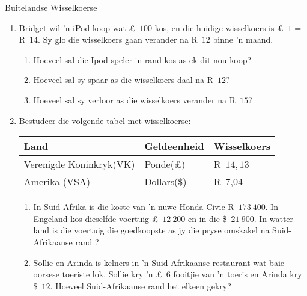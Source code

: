 \begin{exercises}{Buitelandse Wisselkoerse}
{
    \begin{enumerate}[label=\textbf{\arabic*}.]
	\item Bridget wil ’n iPod koop wat £~$100$ kos, en die huidige wisselkoers is £~$1$ = R~$14$. Sy glo die wisselkoers gaan verander na R~$12$ binne ’n maand.
	\begin{enumerate}
	    \item Hoeveel sal die Ipod speler in rand kos as ek dit nou koop?
	    \item Hoeveel sal sy spaar as die wisselkoers daal na R~$12$?
	    \item Hoeveel sal sy verloor as die wisselkoers verander na R~$15$?
	\end{enumerate}

	\item Bestudeer die volgende tabel met wisselkoerse:
	\begin{center}
	    \begin{tabular}{ |l|l|l| }
		\hline
		Land	&	Geldeenheid 	&	Wisselkoers\\ \hline
		Verenigde Koninkryk(VK) 	&	Ponde(£)	&	R~$14,13$\\ \hline
		Amerika (VSA) 	&	Dollars(\$)	&	R~7,04\\ \hline
	    \end{tabular}
	\end{center}
	
	\begin{enumerate}
	    \item In Suid-Afrika is die koste van ’n nuwe Honda Civic R~$173~400$. In Engeland kos dieselfde voertuig £~$12~200$ en in die \$~$21~900$. In watter land is die voertuig die goedkoopste as jy die pryse
omskakel na Suid-Afrikaanse rand ?

	    \item Sollie en Arinda is kelners in ’n Suid-Afrikaanse restaurant wat baie oorsese toeriste lok. Sollie kry ’n £~$6$ fooitjie van ’n toeris en Arinda kry \$~$12$.  Hoeveel Suid-Afrikaanse rand het elkeen gekry?
	\end{enumerate}
    \end{enumerate}

}
\end{exercises}




